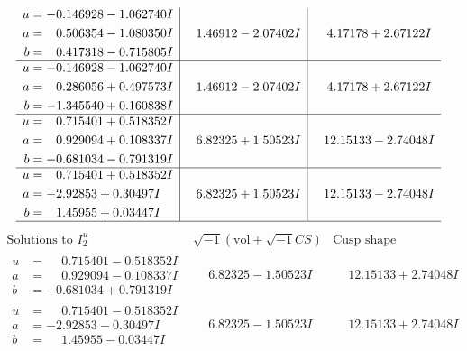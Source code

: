 \documentclass[1p]{elsarticle_modified}
\theoremstyle{definition}
\newcommand{\I}{\sqrt{-1}}
\begin{document}
$$\begin{array}{c|c|c}
\begin{aligned}
u &= -0.146928 - 1.062740 I \\
a &= \phantom{-}0.506354 - 1.080350 I \\
b &= \phantom{-}0.417318 - 0.715805 I\end{aligned}
 & \phantom{-}1.46912 - 2.07402 I & \phantom{-}4.17178 + 2.67122 I \\ \hline\begin{aligned}
u &= -0.146928 - 1.062740 I \\
a &= \phantom{-}0.286056 + 0.497573 I \\
b &= -1.345540 + 0.160838 I\end{aligned}
 & \phantom{-}1.46912 - 2.07402 I & \phantom{-}4.17178 + 2.67122 I \\ \hline\begin{aligned}
u &= \phantom{-}0.715401 + 0.518352 I \\
a &= \phantom{-}0.929094 + 0.108337 I \\
b &= -0.681034 - 0.791319 I\end{aligned}
 & \phantom{-}6.82325 + 1.50523 I & \phantom{-}12.15133 - 2.74048 I \\ \hline\begin{aligned}
u &= \phantom{-}0.715401 + 0.518352 I \\
a &= -2.92853 + 0.30497 I \\
b &= \phantom{-}1.45955 + 0.03447 I\end{aligned}
 & \phantom{-}6.82325 + 1.50523 I & \phantom{-}12.15133 - 2.74048 I\\
 \hline 
 \end{array}$$\newpage$$\begin{array}{c|c|c}  
\text{Solutions to }I^u_{2}& \I (\text{vol} + \sqrt{-1}CS) & \text{Cusp shape}\\
 \hline 
\begin{aligned}
u &= \phantom{-}0.715401 - 0.518352 I \\
a &= \phantom{-}0.929094 - 0.108337 I \\
b &= -0.681034 + 0.791319 I\end{aligned}
 & \phantom{-}6.82325 - 1.50523 I & \phantom{-}12.15133 + 2.74048 I \\ \hline\begin{aligned}
u &= \phantom{-}0.715401 - 0.518352 I \\
a &= -2.92853 - 0.30497 I \\
b &= \phantom{-}1.45955 - 0.03447 I\end{aligned}
 & \phantom{-}6.82325 - 1.50523 I & \phantom{-}12.15133 + 2.74048 I \\ \hline\begin{aligned}

\end{aligned}
\end{array}$$
\end{document}
